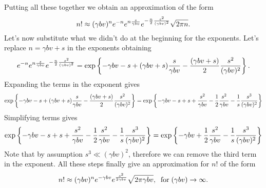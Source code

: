 Putting all these together we obtain an approximation of the form
\begin{equation}
  n! \approx (\gamma b v)^n
             e^{-n}
             e^{n {s \over \gamma b v}}
             e^{-{n \over 2} {s^2 \over (\gamma b v)^2}}
             \sqrt{2 \pi n}.
\end{equation}
Let's now substitute what we didn't do at the beginning for the exponents.
Let's replace $n = \gamma b v + s$ in the exponents obtaining
\begin{equation}
  e^{-n}
  e^{n {s \over \gamma b v}}
  e^{-{n \over 2} {s^2 \over (\gamma b v)^2}} =
  \exp \left\{ -\gamma b v - s
               + (\gamma b v + s){s \over \gamma b v}
               - {(\gamma b v + s) \over 2} {s^2 \over (\gamma b v)^2} \right\}.
\end{equation}
Expanding the terms in the exponent gives
\begin{equation}
\exp \left\{ -\gamma b v - s
             + (\gamma b v + s){s \over \gamma b v}
             - {(\gamma b v + s) \over 2} {s^2 \over (\gamma b v)^2} \right\} =
\exp \left\{ -\gamma b v - s
             + s
             + {s^2 \over \gamma b v}
             - {1 \over 2} {s^2 \over \gamma b v}
             - {1 \over s} {s^3 \over (\gamma b v)^2} \right\}
\end{equation}
Simplifying terms gives
\begin{equation}
  \exp \left\{ -\gamma b v
             - s
             + s
             + {s^2 \over \gamma b v}
             - {1 \over 2} {s^2 \over \gamma b v}
             - {1 \over s} {s^3 \over (\gamma b v)^2} \right\} =
\exp \left\{ -\gamma b v
             + {1 \over 2} {s^2 \over \gamma b v}
             - {1 \over s} {s^3 \over (\gamma b v)^2} \right\}
\end{equation}
Note that by assumption $s^3 \ll (\gamma b v)^2$, therefore we can remove the
third term in the exponent. All these steps finally give an approximation for
$n!$ of the form
\begin{equation}
  n! \approx (\gamma b v)^n e^{-\gamma b v} e^{s^2 \over 2 \gamma b v}
             \sqrt{2 \pi \gamma b v}, \;\;
             \text{for} \; (\gamma b v) \rightarrow \infty.
\end{equation}
